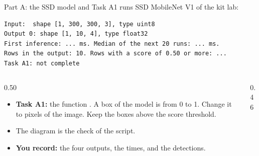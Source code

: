 \begin{frame}[fragile]{Part A: the SSD model and Task A1}
  \small
   runs SSD MobileNet V1 of
  the kit lab:
\begin{lstlisting}
Input:  shape [1, 300, 300, 3], type uint8
Output 0: shape [1, 10, 4], type float32
First inference: ... ms. Median of the next 20 runs: ... ms.
Rows in the output: 10. Rows with a score of 0.50 or more: ...
Task A1: not complete
\end{lstlisting}
  \begin{columns}[c]
    \begin{column}{0.50\textwidth}
      \begin{itemize}
        \item \textbf{Task A1:} the function . A
              box of the model is  from 0 to
              1. Change it to pixels of the image. Keep the boxes above
              the score threshold.
        \item The diagram is the check of the script.
        \item \textbf{You record:} the four outputs, the times, and the
              detections.
      \end{itemize}
    \end{column}
    \begin{column}{0.46\textwidth}
      \centering
    \end{column}
  \end{columns}
\end{frame}

